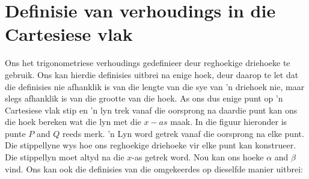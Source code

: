 \section{Definisie van verhoudings in die Cartesiese vlak}

Ons het trigonometriese verhoudings gedefinieer deur reghoekige driehoeke te gebruik. Ons kan hierdie definisies uitbrei na enige hoek, deur daarop te let dat die definisies nie afhanklik is van die lengte van die sye van 'n driehoek nie, maar slegs afhanklik is van die grootte van die hoek. As ons dus enige punt op 'n Cartesiese vlak stip en 'n lyn trek vanaf die oorsprong na daardie punt kan ons die hoek bereken wat die lyn met die $x-as$ maak. In die figuur hieronder is punte $P$ and $Q$ reeds merk. 'n Lyn word getrek vanaf die oorsprong na elke punt. Die stippellyne wys hoe ons reghoekige driehoeke vir elke punt kan konstrueer. Die stippellyn moet altyd na die $x$-as getrek word. Nou kan ons hoeke $\alpha$ and $\beta$ vind. Ons kan ook die definisies van die omgekeerdes op dieselfde manier uitbrei:



